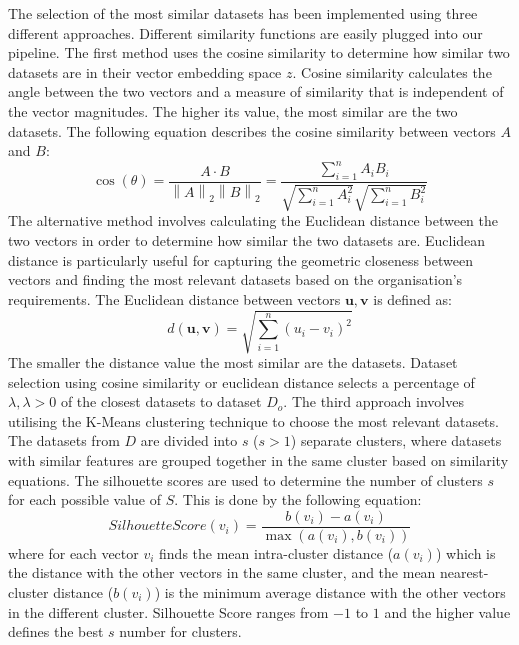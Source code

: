The selection of the most similar datasets has been implemented using three different approaches. Different similarity functions are easily plugged into our pipeline. The first method uses the cosine similarity to determine how similar two datasets are in their vector embedding space $z$. Cosine similarity calculates the angle between the two vectors and a measure of similarity that is independent of the vector magnitudes. The higher its value, the most similar are the two datasets. The following equation describes the cosine similarity between vectors $A$ and $B$: 
\begin{equation}
    \cos\left(\theta\right) = \dfrac {A \cdot B} {\left\| A\right\| _{2}\left\| B\right\| _{2}} = \dfrac{\sum_{i=1}^{n} A_iB_i}{\sqrt{\sum_{i=1}^{n} A^2_i} \sqrt{\sum_{i=1}^{n} B^2_i}} \label{eq_7_cos_sim}
\end{equation}
 The alternative method involves calculating the Euclidean distance between the two vectors in order to determine how similar the two datasets are. Euclidean distance is particularly useful for capturing the geometric closeness between vectors and finding the most relevant datasets based on the organisation's requirements. The Euclidean distance between vectors $\mathbf{u}, \mathbf{v}$ is defined as:
\begin{equation}
d(\mathbf{u}, \mathbf{v}) = \sqrt{\sum_{i=1}^{n} (u_i - v_i)^2}\label{eq_8_eucl_dist}
\end{equation}
The smaller the distance value the most similar are the datasets. Dataset selection using cosine similarity or euclidean distance selects a percentage of $\lambda, \lambda > 0$ of the closest datasets to dataset $D_o$. The third approach involves utilising the K-Means \cite{b17KMeansa, b17KMeansb} clustering technique to choose the most relevant datasets. The datasets from $D$ are divided into $s$ ($s > 1$) separate clusters, where datasets with similar features are grouped together in the same cluster based on similarity equations.
The silhouette scores \cite{b18Silhouettes} are used to determine the number of clusters $s$ for each possible value of $S$. This is done by the following equation:
\begin{equation}
    SilhouetteScore(v_i) = \frac{b(v_i) - a(v_i)}{\max(a(v_i), b(v_i))} \label{eq_9_shilouete_score}
\end{equation}
where for each vector $v_i$ finds the mean intra-cluster distance ($a(v_i)$) which is the distance with the other vectors in the same cluster, and the mean nearest-cluster distance ($b(v_i)$) is the minimum average distance with the other vectors in the different cluster. Silhouette Score ranges from $-1$ to $1$ and the higher value defines the best $s$ number for clusters. 

